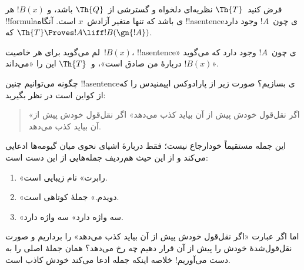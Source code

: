\documentclass[../../../include/open-logic-section]{subfiles}
\begin{document}
\begin{lem}
فرض کنید~$\Th{T}$ نظریه‌ای دلخواه و گسترشی از~$\Th{Q}$ باشد، و
$!B(x)$ هر !!{formula}ی باشد که تنها متغیر آزادش~$x$ است. آنگاه
!!a{sentence}ی چون~$!A$ وجود دارد که
$\Th{T} \Proves!A \liff !B(\gn{!A})$.
\end{lem}

لم می‌گوید برای هر خاصیت~$!B(x)$، !!a{sentence}ی چون~$!A$ وجود دارد که
می‌گوید «$!B(x)$ دربارهٔ من صادق است»، و~$\Th{T}$ این را «می‌داند».

چگونه می‌توانیم چنین !!a{sentence}ی بسازیم؟ صورت زیر از پارادوکس
اپیمنیدس را که از کواین است در نظر بگیرید:
\begin{quote}
«اگر نقل‌قول خودش پیش از آن بیاید کذب می‌دهد» اگر نقل‌قول خودش پیش از
آن بیاید کذب می‌دهد.
\end{quote}
این جمله مستقیماً خودارجاع نیست؛ فقط دربارهٔ اشیای نحوی میان گیومه‌ها
ادعایی می‌کند و از این حیث هم‌ردیف جمله‌هایی از این دست است:
\begin{enumerate}
\item «رابرت» نام زیبایی است.
\item «دویدم.» جملهٔ کوتاهی است.
\item «سه واژه دارد» سه واژه دارد.
\end{enumerate}
اما اگر عبارت «اگر نقل‌قول خودش پیش از آن بیاید کذب می‌دهد» را برداریم
و صورت نقل‌قول‌شدهٔ خودش را پیش از آن قرار دهیم چه رخ می‌دهد؟ همان جملهٔ
اصلی را به دست می‌آوریم!{} خلاصه اینکه جمله ادعا می‌کند خودش کاذب است.
\end{document}
